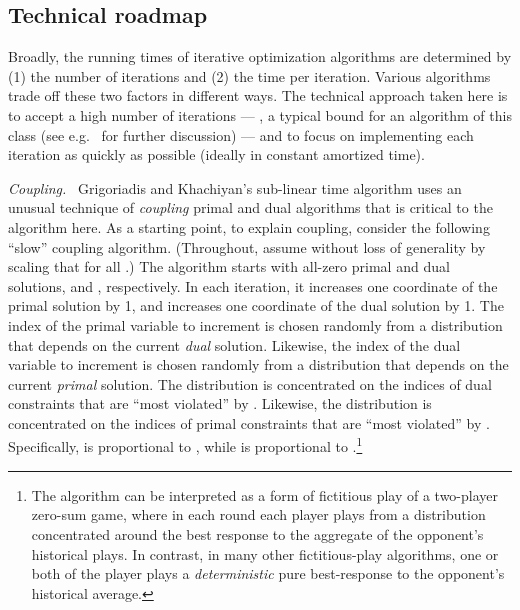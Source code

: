 \documentclass[11pt]{svjour3} \usepackage{fullpage}
\renewcommand{\paragraph}[1]{\smallskip\vspace{2pt}\par{\em #1}~}
\begin{document}
\subsection{Technical roadmap}
Broadly, the running times of iterative optimization algorithms are determined by (1) the number of iterations and (2) the time per iteration.  Various algorithms trade off these two factors in different ways.  The technical approach taken here is to accept a high number of iterations --- , a typical bound for an algorithm of this class
(see e.g.~\cite{Klein99Number} for further discussion) ---
and to focus on implementing each iteration as quickly as possible
(ideally in constant amortized time).

\paragraph{Coupling.}
Grigoriadis and Khachiyan's sub-linear time algorithm
uses an unusual technique of {\em coupling} primal and dual algorithms
that is critical to the algorithm here.
As a starting point, to explain coupling, consider the following ``slow'' coupling algorithm.
(Throughout, assume without loss of generality by scaling that  for all .)
The algorithm starts with all-zero primal and dual solutions,  and , respectively.
In each iteration, it increases one coordinate  of the primal solution  by 1, 
and increases one coordinate  of the dual solution  by 1.
The index  of the primal variable to increment is chosen randomly from a distribution  that depends on the current {\em dual} solution.
Likewise, the index  of the dual variable to increment is chosen randomly from a distribution  that depends on the current {\em primal} solution.
The distribution  is concentrated on the indices of dual constraints  that are ``most violated'' by .
Likewise, the distribution  is concentrated on the indices of primal constraints  that are ``most violated'' by .
Specifically,  is proportional to ,
while  is proportional to .\footnote{
The algorithm can be interpreted as a form of fictitious play of a two-player zero-sum game, where in each round each player plays from a distribution concentrated around the best response to the aggregate of the opponent's historical plays.  In contrast, in many other fictitious-play algorithms, one or both of the player plays a {\em deterministic} pure best-response to the opponent's historical average.}
\end{document}
